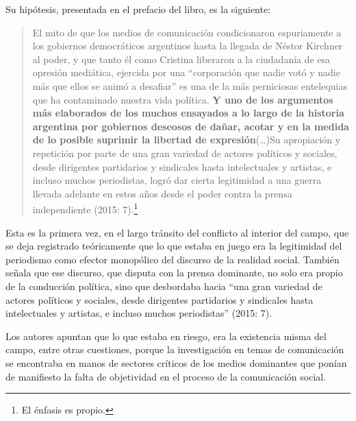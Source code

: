 Su hipótesis, presentada en el prefacio del libro, es la siguiente:

\begin{quote}
El mito de que los medios de comunicación condicionaron espuriamente a los gobiernos democráticos argentinos hasta la llegada de Néstor Kirchner al poder, y que tanto él como Cristina liberaron a la ciudadanía de esa opresión mediática, ejercida por una ``corporación que nadie votó y nadie más que ellos se animó a desafiar'' es una de la más perniciosas entelequias que ha contaminado nuestra vida política. \textbf{Y uno de los argumentos más elaborados de los muchos ensayados a lo largo de la historia argentina por gobiernos deseosos de dañar, acotar y en la medida de lo posible suprimir la libertad de expresión}(\ldots)Su apropiación y repetición por parte de una gran variedad de actores políticos y sociales, desde dirigentes partidarios y sindicales hasta intelectuales y artistas, e incluso muchos periodistas, logró dar cierta legitimidad a una guerra llevada adelante en estos años desde el poder contra la prensa independiente (2015: 7).\footnote{El énfasis es propio.}
\end{quote}

Esta es la primera vez, en el largo tránsito del conflicto al interior del campo, que se deja registrado teóricamente que lo que estaba en juego era la legitimidad del periodismo como efector monopólico del discurso de la realidad social. También señala que ese discurso, que disputa con la prensa dominante, no solo era propio de la conducción política, sino que desbordaba hacia ``una gran variedad de actores políticos y sociales, desde dirigentes partidarios y sindicales hasta intelectuales y artistas, e incluso muchos periodistas'' (2015: 7).

Los autores apuntan que lo que estaba en riesgo, era la existencia misma del campo, entre otras cuestiones, porque la investigación en temas de comunicación se encontraba en manos de sectores críticos de los medios dominantes que ponían de manifiesto la falta de objetividad en el proceso de la comunicación social.

